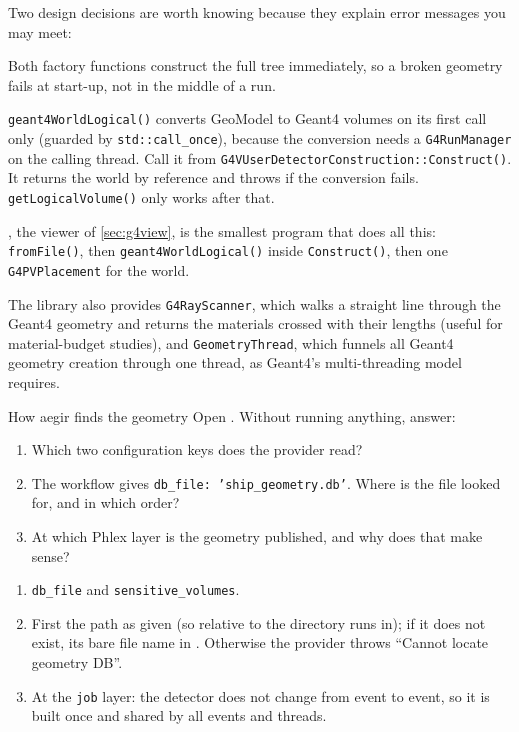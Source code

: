 Two design decisions are worth knowing because they explain error messages
you may meet:

\begin{description}[style=nextline]
  \item[The GeoModel tree is built eagerly.] Both factory functions construct
    the full tree immediately, so a broken geometry fails at start-up, not in
    the middle of a run.
  \item[The Geant4 conversion is lazy.] \texttt{geant4WorldLogical()} converts
    GeoModel to Geant4 volumes on its first call only (guarded by
    \texttt{std::call\_once}), because the conversion needs a
    \texttt{G4RunManager} on the calling thread. Call it from
    \texttt{G4VUserDetectorConstruction::Construct()}. It returns the world
    by reference and throws if the conversion fails.
    \texttt{getLogicalVolume()} only works after that.
\end{description}

, the viewer of \cref{sec:g4view}, is the smallest program
that does all this: \texttt{fromFile()}, then \texttt{geant4WorldLogical()}
inside \texttt{Construct()}, then one \texttt{G4PVPlacement} for the world.

The library also provides \texttt{G4RayScanner}, which walks a straight line
through the Geant4 geometry and returns the materials crossed with their
lengths (useful for material-budget studies), and \texttt{GeometryThread},
which funnels all Geant4 geometry creation through one thread, as Geant4's
multi-threading model requires.

\begin{exercise}{How aegir finds the geometry}
Open . Without running
anything, answer:
\begin{enumerate}
  \item Which two configuration keys does the provider read?
  \item The workflow gives \texttt{db\_file: 'ship\_geometry.db'}. Where is
        the file looked for, and in which order?
  \item At which Phlex layer is the geometry published, and why does that
        make sense?
\end{enumerate}
\end{exercise}

\begin{solution}
\begin{enumerate}
  \item \texttt{db\_file} and \texttt{sensitive\_volumes}.
  \item First the path as given (so relative to the directory  runs
        in); if it does not exist, its bare file name in
        . Otherwise the provider
        throws ``Cannot locate geometry DB''.
  \item At the \texttt{job} layer: the detector does not change from event to
        event, so it is built once and shared by all events and threads.
\end{enumerate}
\end{solution}

